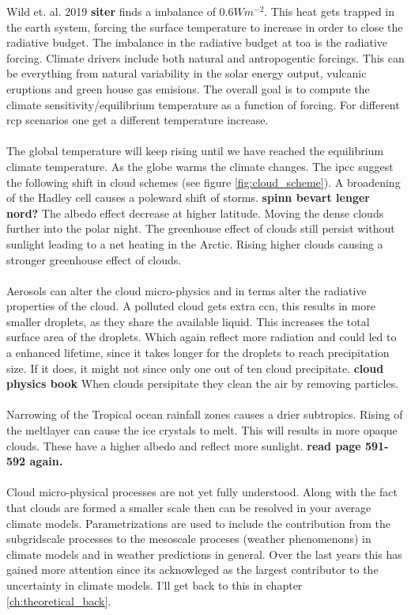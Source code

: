 Wild et. al. 2019  \textbf{siter} finds a imbalance of $0.6W m^{-2}$. This heat gets trapped in the earth system, forcing the surface temperature to increase in order to close the radiative budget. The imbalance in the radiative budget at \acrshort{toa} is the radiative forcing. Climate drivers include both natural and antropogentic forcings. This can be everything from natural variability in the solar energy output, vulcanic eruptions and green house gas emisions. The overall goal is to compute the climate sensitivity/equilibrium temperature as a function of forcing. For different \acrfull{rcp} scenarios one get a different temperature increase.
\\ \\ 
The global temperature will keep rising until we have reached the equilibrium climate temperature. As the globe warms the climate changes. The \acrshort{ipcc} suggest the following shift in cloud schemes (see figure \ref{fig:cloud_scheme}). A broadening of the Hadley cell causes a poleward shift of storms. \textbf{spinn bevart lenger nord?} The albedo effect decrease at higher latitude. Moving the dense clouds further into the polar night. %
The greenhouse effect of clouds still persist without sunlight leading to a net heating in the Arctic. Rising higher clouds causing a stronger greenhouse effect of clouds.
\\ \\
Aerosols can alter the cloud micro-physics and in terms alter the radiative properties of the cloud. A polluted cloud gets extra \acrshort{ccn}, this results in more smaller droplets, as they share the available liquid. This increases the total surface area of the droplets. Which again reflect more radiation and could led to a enhanced lifetime, since it takes longer for the droplets to reach precipitation size. If it does, it might not since only one out of ten cloud precipitate. \textbf{cloud physics book} When clouds persipitate they clean the air by removing particles.
\\ \\ 
Narrowing of the Tropical ocean rainfall zones causes a drier subtropics. Rising of the meltlayer can cause the ice crystals to melt. This will results in more opaque clouds. These have a higher albedo and reflect more sunlight. \textbf{read page 591-592 again.}
\\ \\
Cloud micro-physical processes are not yet fully understood. Along with the fact that clouds are formed a smaller scale then can be resolved in your average climate models. Parametrizations are used to include the contribution from the subgridscale processes to the mesoscale proceses (weather phenomenons) in climate models and in weather predictions in general. Over the last years this has gained more attention since its acknowleged as the largest contributor to the uncertainty in climate models. I'll get back to this in chapter \ref{ch:theoretical_back}.

